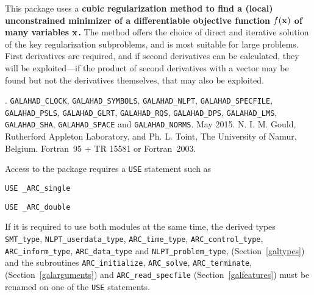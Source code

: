 \documentclass{galahad}
\newcommand{\packagename}{ARC}
\newcommand{\fullpackagename}{\libraryname\_\packagename}
\begin{document}
\galheader


\galsummary
This package uses a {\bf cubic regularization method to find a (local)
unconstrained minimizer of a differentiable objective function $f({\mathbf{x}})$
of many variables ${\mathbf{x}}$.} The method offers the choice of direct
and iterative solution of the key regularization subproblems, and
is most suitable for large problems. First derivatives are required,
and if second derivatives can be calculated, they will be exploited---if
the product of second derivatives with a vector may be found but
not the derivatives themselves, that may also be exploited.


\galattributes
\galversions{\tt  \fullpackagename\_single, \fullpackagename\_double}.
\galuses
{\tt GALAHAD\_CLOCK},
{\tt GALAHAD\_SY\-M\-BOLS},
{\tt GALAHAD\_NLPT},
{\tt GALAHAD\_SPECFILE},
{\tt GALAHAD\_PSLS},
{\tt GALAHAD\_GLRT},
{\tt GALAHAD\_RQS},
{\tt GALAHAD\_DPS},
{\tt GALAHAD\_LMS},
{\tt GALAHAD\_SHA},
{\tt GALAHAD\_SPACE} and
{\tt GALAHAD\_NORMS}.
\galdate May 2015.
\galorigin N. I. M. Gould, Rutherford Appleton Laboratory,
and Ph. L. Toint, The University of Namur, Belgium.
\gallanguage Fortran~95 + TR 15581 or Fortran~2003.


\galhowto


Access to the package requires a {\tt USE} statement such as

\medskip{}

\hspace{8mm} {\tt USE \fullpackagename\_single}

\medskip{}

\hspace{8mm} {\tt USE  \fullpackagename\_double}

\medskip

\noindent
If it is required to use both modules at the same time, the derived types
{\tt SMT\_type},
{\tt NLPT\_userdata\_type},
{\tt \packagename\_time\_\-type},
{\tt \packagename\_control\_type},
{\tt \packagename\_inform\_type},
{\tt \packagename\_data\_type}
and
{\tt NLPT\_problem\_type},
(Section~\ref{galtypes})
and the subroutines
{\tt \packagename\_initialize},
{\tt \packagename\_\-solve},
{\tt \packagename\_terminate},
(Section~\ref{galarguments})
and
{\tt \packagename\_read\_specfile}
(Section~\ref{galfeatures})
must be renamed on one of the {\tt USE} statements.
\end{document}

